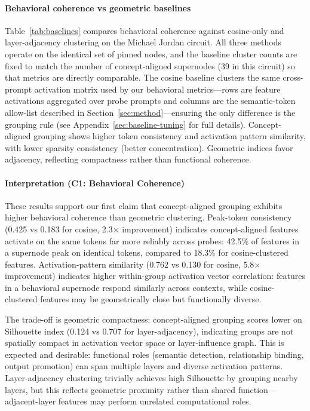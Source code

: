 \paragraph{Behavioral coherence vs geometric baselines}
Table~\ref{tab:baselines} compares behavioral coherence against cosine-only and layer-adjacency clustering on the Michael Jordan circuit. All three methods operate on the identical set of pinned nodes, and the baseline cluster counts are fixed to match the number of concept-aligned supernodes (39 in this circuit) so that metrics are directly comparable. The cosine baseline clusters the same cross-prompt activation matrix used by our behavioral metrics—rows are feature activations aggregated over probe prompts and columns are the semantic-token allow-list described in Section~\ref{sec:method}—ensuring the only difference is the grouping rule (see Appendix~\ref{sec:baseline-tuning} for full details). Concept-aligned grouping shows higher token consistency and activation pattern similarity, with lower sparsity consistency (better concentration). Geometric indices favor adjacency, reflecting compactness rather than functional coherence.


\paragraph{Interpretation (C1: Behavioral Coherence)}
These results support our first claim that concept-aligned grouping exhibits higher behavioral coherence than geometric clustering. Peak-token consistency (0.425 vs 0.183 for cosine, 2.3$\times$ improvement) indicates concept-aligned features activate on the same tokens far more reliably across probes: 42.5\% of features in a supernode peak on identical tokens, compared to 18.3\% for cosine-clustered features. Activation-pattern similarity (0.762 vs 0.130 for cosine, 5.8$\times$ improvement) indicates higher within-group activation vector correlation: features in a behavioral supernode respond similarly across contexts, while cosine-clustered features may be geometrically close but functionally diverse.

The trade-off is geometric compactness: concept-aligned grouping scores lower on Silhouette index (0.124 vs 0.707 for layer-adjacency), indicating groups are not spatially compact in activation vector space or layer-influence graph. This is expected and desirable: functional roles (semantic detection, relationship binding, output promotion) can span multiple layers and diverse activation patterns. Layer-adjacency clustering trivially achieves high Silhouette by grouping nearby layers, but this reflects geometric proximity rather than shared function---adjacent-layer features may perform unrelated computational roles.

